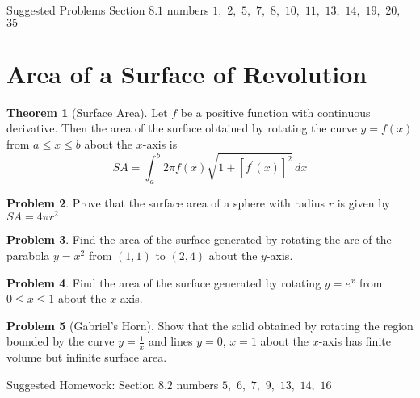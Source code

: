 \documentclass[letterpaper, twoside, 12pt]{book}
\theoremstyle{definition}
\newtheorem{theorem}{Theorem}
\theoremstyle{definition}
\newtheorem{problem}[theorem]{Problem}
\begin{document}
\vfill

\noindent Suggested Problems Section $8.1$ numbers $1,$ $2,$ $5,$ $7,$ $8,$ $10,$ $11,$ $13,$ $14,$ $19,$ $20,$ $35$

\newpage

\section{Area of a Surface of Revolution}

\begin{theorem}[Surface Area]
  Let $f$ be a positive function with continuous derivative.
  Then the area of the surface obtained by rotating the
  curve $y = f(x)$ from $a \leq x \leq b$ about the $x$-axis is
  \[
    SA
      =
    \int_a^b 2\pi f(x) \sqrt{1+\left[f^\prime\left(x\right)\right]^2} \, dx
  \]
\end{theorem}

\begin{problem}
  Prove that the surface area of a sphere with radius $r$ is given by
  $SA=4\pi r^2$
\end{problem}

\vfill

\begin{problem}
  Find the area of the surface generated by rotating the arc of the parabola
  $y = x^2$ from $(1,1)$ to $(2,4)$ about the $y$-axis.
\end{problem}

\vfill

\newpage

\begin{problem}
 Find the area of the surface generated by rotating $y=e^x$
 from $0 \leq x \leq 1$ about the $x$-axis.
\end{problem}

\vfill

\begin{problem}[Gabriel's Horn]
  Show that the solid obtained by rotating the region
  bounded by the curve $y=\frac{1}{x}$ and lines $y=0$, $x=1$ about the
  $x$-axis has finite volume but infinite surface area.
\end{problem}

\vfill

\noindent Suggested Homework: Section $8.2$ numbers $5,$ $6,$ $7,$ $9,$ $13,$ $14,$ $16$
\end{document}
